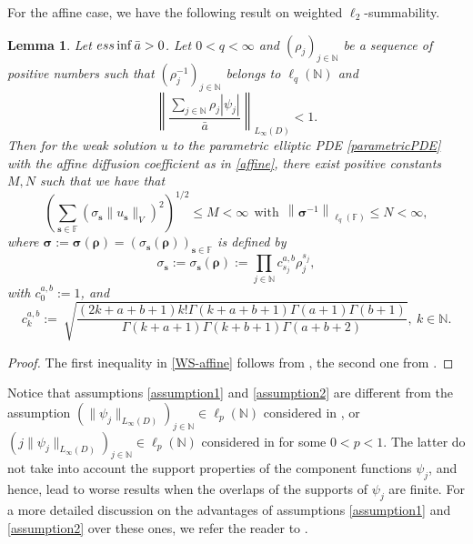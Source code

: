 \documentclass[11pt]{article}
\newtheorem{lemma}{Lemma}[section]
\numberwithin{equation}{section}
\theoremstyle{definition}
\theoremstyle{remark}
\newcommand{\brac}[1]{\left(#1\right)}
\newcommand{\norm}[2]{\left\|{#1}\right\|_{#2}}
\newcommand{\bs}{{\boldsymbol{s}}}
\newcommand{\brho}{{\boldsymbol{\rho}}}
\newcommand{\bsigma}{{\boldsymbol{\sigma}}}
\def\NN{{\mathbb N}}
\def\NN{{\mathbb N}}
\def\FF{{\mathcal F}}
\def\FF{{\mathcal F}}
\def\NN{{\mathbb N}}
\def\FF{{\mathbb F}}
\begin{document}
 	
 	\medskip
 	For the affine case, we have the following result on weighted $\ell_2$-summability.
 	\begin{lemma} \label{lemma:weighted summablity,affine} 
 		Let ${\rm ess} \inf \bar a>0$. 	Let $0 < q <\infty$ and	
 		$(\rho_j) _{j \in \NN}$ be a sequence of positive 
 		numbers such that $(\rho_j^{-1}) _{j \in 
 			\NN}$ belongs to $\ell_q(\NN)$ and
 		\begin{equation} \label{assumption2}
 			\left \| \frac{\sum _{j \in \NN} \rho_j|\psi_j|}{\bar a} \right \|_{L_\infty(D)} 
 			< 1.
 		\end{equation} 
 		{Then for the weak solution $u$ to the parametric elliptic PDE \eqref{parametricPDE}  with the affine  diffusion coefficient as in \eqref{affine},} there exist positive constants $M,N$ such that we have that
 		\begin{equation} \label{WS-affine}
 			\left(\sum_{\bs\in\FF} (\sigma_\bs \| u_\bs\|_{V})^2\right)^{1/2} \le M <\infty \ \ \text{with} \ \
 			\norm{\bsigma^{-1}}{{\ell_q(\FF)}} \le N < \infty,
 		\end{equation}
 		where {$\bsigma:=\bsigma(\brho)=(\sigma_\bs(\brho))_{\bs \in \FF}$} is defined by
 		$$
 		\sigma_\bs:=\sigma_\bs (\brho):= \prod _{j \in \NN} c_{s_j}^{a,b}\rho_j^{s_j},
 		$$
        with $c_0^{a,b}:= 1$, and
 		\begin{equation*}
 			c_k^{a,b}
 			:= \
 			\sqrt{\frac{(2k+a+b+1)k! \Gamma(k+a+b+1) \Gamma(a+1) \Gamma(b+1)}
 				{\Gamma(k+a+1)\Gamma(k+b+1)\Gamma(a+b+2)}}, \ k \in \NN.
 		\end{equation*}
 	\end{lemma}
 	
 	{
 		\begin{proof}
The first inequality  in \eqref{WS-affine} follows from \cite[Remark 5.3]{BCM17}, the second one from 	\cite[(63)]{BCDC17}.
 		\hfill
 	\end{proof}
 }
 	
 	\medskip
 	{Notice that assumptions} \eqref{assumption1} and \eqref{assumption2} are different from the assumption 
        {$\brac{\|\psi_j\|_{L_\infty(D)}}_{j \in \NN} \in \ell_p(\NN)$} considered in \cite{CCDS13,CDS10,CDS11}, or 
        {$\brac{j\|\psi_j\|_{L_\infty(D)}}_{j \in \NN} \in \ell_p(\NN)$} considered in \cite{HoSc14} for some $0<p<1$.
        The latter {do not take} into account the support properties of the component functions $\psi_j$, and hence, lead to worse results when the overlaps of the supports of $\psi_j$ are finite. 
 		For a more detailed discussion on the advantages of assumptions \eqref{assumption1} and \eqref{assumption2} over these ones, we refer the reader to \cite{BCM17, BCDM17, Dung21, DNSZ2023}.
 		
\end{document}
